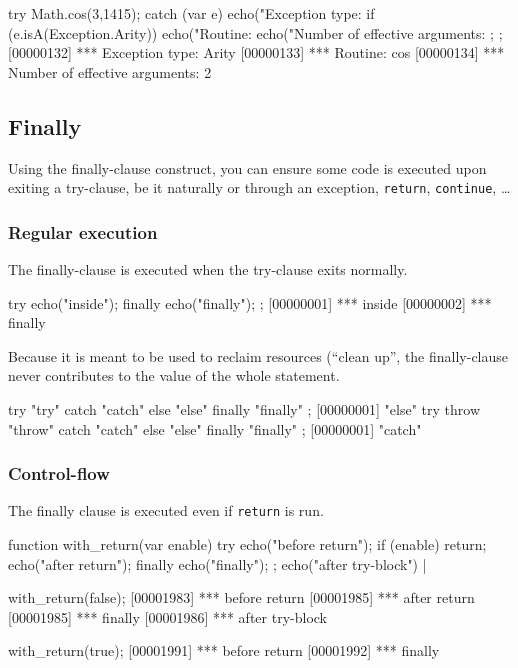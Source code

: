 \begin{urbiscript}
try
{
  Math.cos(3,1415);
}
catch (var e)
{
  echo("Exception type: %
  if (e.isA(Exception.Arity))
  {
    echo("Routine: %
    echo("Number of effective arguments: %
  };
};
[00000132] *** Exception type: Arity
[00000133] *** Routine: cos
[00000134] *** Number of effective arguments: 2
\end{urbiscript}

\subsection{Finally}
\label{sec:lang:except:finally}
Using the finally-clause construct, you can ensure some code is executed
upon exiting a try-clause, be it naturally or through an exception,
\lstinline{return}, \lstinline{continue}, \ldots

\subsubsection{Regular execution}

The finally-clause is executed when the try-clause exits normally.

\begin{urbiscript}
try
{
  echo("inside");
}
finally
{
  echo("finally");
};
[00000001] *** inside
[00000002] *** finally
\end{urbiscript}

Because it is meant to be used to reclaim resources (``clean up'', the
finally-clause never contributes to the value of the whole statement.

\begin{urbiscript}
try { "try" } catch { "catch" } else { "else" } finally { "finally" };
[00000001] "else"
try { throw "throw" } catch { "catch" } else { "else" } finally { "finally" };
[00000001] "catch"
\end{urbiscript}


\subsubsection{Control-flow}

The finally clause is executed even if \lstinline{return} is run.

\begin{urbiscript}
function with_return(var enable)
{
  try
  {
    echo("before return");
    if (enable)
      return;
    echo("after return");
  }
  finally
  {
    echo("finally");
  };
  echo("after try-block")
}|

with_return(false);
[00001983] *** before return
[00001985] *** after return
[00001985] *** finally
[00001986] *** after try-block

with_return(true);
[00001991] *** before return
[00001992] *** finally
\end{urbiscript}

